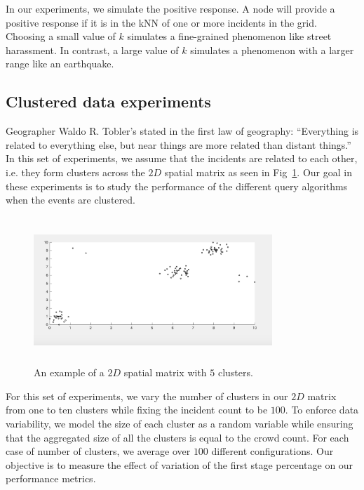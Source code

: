 \documentclass{acm_proc_article-sp}
\begin{document}
In our experiments, we simulate the positive response. A node will provide a positive response if it is in the kNN of one or more incidents in the grid. Choosing a small value of $k$ simulates a fine-grained phenomenon like street harassment. In contrast, a large value of $k$ simulates a phenomenon with a larger range like an earthquake.
\subsection{Clustered data experiments}
Geographer Waldo R. Tobler's stated in the first law of geography: ``Everything is related to everything else, but near things are more related than distant things.'' In this set of experiments, we assume that the incidents are related to each other,  i.e. they form clusters across the $2D$ spatial matrix as seen in Fig~\ref{fig: clust}. Our goal in these experiments is to study the performance of the different query algorithms when the events are clustered.\par
\begin{figure}[!b]
\centering
\includegraphics[width=9cm ,height=5.5cm]{figuresPng/clust.png}
\caption{An example of a $2D$ spatial matrix with $5$ clusters.}\label{fig: clust}
\end{figure}

For this set of experiments, we vary the number of clusters in our $2D$ matrix from one to ten clusters while fixing the incident count to be $100$. To enforce data variability, we model the size of each cluster as a random variable while ensuring that the aggregated size of all the clusters is equal to the crowd count. For each case of number of clusters, we average over $100$ different configurations. Our objective is to measure the effect of variation of the first stage percentage on our performance metrics.\par
\end{document}
